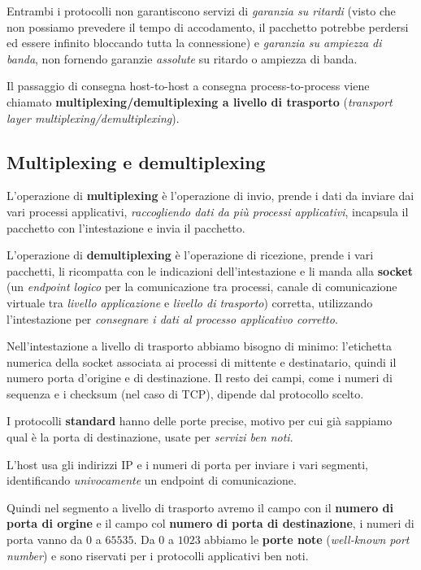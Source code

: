 Entrambi i protocolli non garantiscono servizi di \textit{garanzia su ritardi} (visto che non possiamo prevedere il tempo di accodamento, il pacchetto potrebbe perdersi ed essere infinito bloccando tutta la connessione) e \textit{garanzia su ampiezza di banda}, non fornendo garanzie \textit{assolute} su ritardo o ampiezza di banda.

Il passaggio di consegna host-to-host a consegna process-to-process viene chiamato \textbf{multiplexing/demultiplexing a livello di trasporto} (\textit{transport layer multiplexing/demultiplexing}).

\subsection{Multiplexing e demultiplexing}

L'operazione di \textbf{multiplexing} è l'operazione di invio, prende i dati da inviare dai vari processi applicativi, \textit{raccogliendo dati da più processi applicativi}, incapsula il pacchetto con l'intestazione e invia il pacchetto.

L'operazione di \textbf{demultiplexing} è l'operazione di ricezione, prende i vari pacchetti, li ricompatta con le indicazioni dell'intestazione e li manda alla \textbf{socket} (un \textit{endpoint logico} per la comunicazione tra processi, canale di comunicazione virtuale tra \textit{livello applicazione} e \textit{livello di trasporto}) corretta, utilizzando l'intestazione per \textit{consegnare i dati al processo applicativo corretto}.

Nell'intestazione a livello di trasporto abbiamo bisogno di minimo: l'etichetta numerica della socket associata ai processi di mittente e destinatario, quindi il numero porta d'origine e di destinazione. Il resto dei campi, come i numeri di sequenza e i checksum (nel caso di TCP), dipende dal protocollo scelto.

I protocolli \textbf{standard} hanno delle porte precise, motivo per cui già sappiamo qual è la porta di destinazione, usate per \textit{servizi ben noti}.

L'host usa gli indirizzi IP e i numeri di porta per inviare i vari segmenti, identificando \textit{univocamente} un endpoint di comunicazione.

Quindi nel segmento a livello di trasporto avremo il campo con il \textbf{numero di porta di orgine} e il campo col \textbf{numero di porta di destinazione}, i numeri di porta vanno da $0$ a $65535$. Da $0$ a $1023$ abbiamo le \textbf{porte note} (\textit{well-known port number}) e sono riservati per i protocolli applicativi ben noti. 

